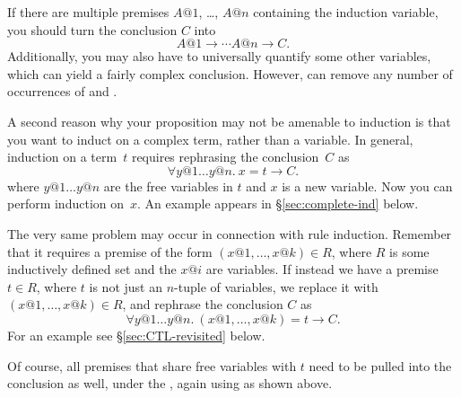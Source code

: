 \begin{isabellebody}
\begin{isamarkuptxt}
If there are multiple premises $A@1$, \dots, $A@n$ containing the
induction variable, you should turn the conclusion $C$ into
\[ A@1 \longrightarrow \cdots A@n \longrightarrow C. \]
Additionally, you may also have to universally quantify some other variables,
which can yield a fairly complex conclusion.  However,  
can remove any number of occurrences of  and
.

%
A second reason why your proposition may not be amenable to induction is that
you want to induct on a complex term, rather than a variable. In
general, induction on a term~$t$ requires rephrasing the conclusion~$C$
as
\begin{equation}\label{eqn:ind-over-term}
\forall y@1 \dots y@n.~ x = t \longrightarrow C.
\end{equation}
where $y@1 \dots y@n$ are the free variables in $t$ and $x$ is a new variable.
Now you can perform induction on~$x$. An example appears in
\S\ref{sec:complete-ind} below.

The very same problem may occur in connection with rule induction. Remember
that it requires a premise of the form $(x@1,\dots,x@k) \in R$, where $R$ is
some inductively defined set and the $x@i$ are variables.  If instead we have
a premise $t \in R$, where $t$ is not just an $n$-tuple of variables, we
replace it with $(x@1,\dots,x@k) \in R$, and rephrase the conclusion $C$ as
\[ \forall y@1 \dots y@n.~ (x@1,\dots,x@k) = t \longrightarrow C. \]
For an example see \S\ref{sec:CTL-revisited} below.

Of course, all premises that share free variables with $t$ need to be pulled into
the conclusion as well, under the , again using  as shown above.


\end{isamarkuptxt}
\end{isabellebody}
